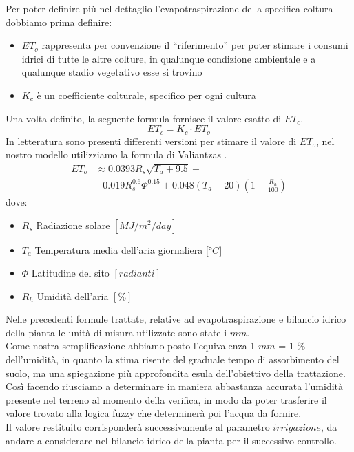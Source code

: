 \documentclass[conference,10pt]{IEEEtran}
\begin{document}
Per poter definire più nel dettaglio l'evapotraspirazione della specifica coltura dobbiamo prima definire:
\begin{itemize}
	\item $ET_o$ rappresenta per convenzione il “riferimento” per poter stimare i consumi idrici di tutte le
	altre colture, in qualunque condizione ambientale e a qualunque stadio vegetativo esse si trovino
	\item $K_c$ è un coefficiente colturale, specifico per ogni cultura
\end{itemize}
Una volta definito, la seguente formula fornisce il valore esatto di $ET_c$.
\begin{equation*}
ET_c = K_c \cdot ET_o
\end{equation*}
In letteratura sono presenti differenti versioni per stimare il valore di $ET_o$, nel nostro modello utilizziamo la formula di Valiantzas \cite{8}. \\
\begin{equation*}
\begin{split}
ET_o &\approx 0.0393R_s\sqrt{T_a + 9.5} -\\ &-0.019R_s^{0.6}\Phi^{0.15}+0.048(T_a+20)(1-\frac{R_h}{100})
\end{split}
\end{equation*} 
dove:
\begin{itemize}
	\item $R_s$ Radiazione solare $[MJ/m^2/day]$
	\item $T_a$ Temperatura media dell'aria giornaliera $[$°$C]$
	\item $\Phi$ Latitudine del sito $[radianti]$
	\item $R_h$ Umidità dell'aria $[\%]$
	\newline
\end{itemize}
Nelle precedenti formule trattate, relative ad evapotraspirazione e bilancio idrico della pianta le unità di misura utilizzate sono state i $mm$.\\
 Come nostra semplificazione abbiamo posto l'equivalenza 1 $mm$ = 1 \% dell'umidità, in quanto la stima risente del graduale tempo di assorbimento del suolo, ma una spiegazione più approfondita esula dell'obiettivo della trattazione.
\\ Così facendo riusciamo a determinare in maniera abbastanza accurata l'umidità presente nel terreno al momento della verifica, in modo da poter trasferire il valore trovato alla logica fuzzy che determinerà poi l'acqua da fornire. \\
Il valore restituito corrisponderà successivamente al parametro $irrigazione$, da andare a considerare nel bilancio idrico della pianta per il successivo controllo.\\
\end{document}
